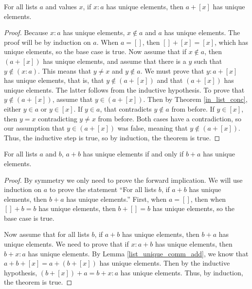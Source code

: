 \documentclass[../math.tex]{subfiles}
\begin{document}
\begin{lemma} \label{list_unique_comm_add}
    For all lists $a$ and values $x$, if $x : a$ has unique elements, then $a +
    [x]$ has unique elements.
\end{lemma}
\begin{proof}
    Because $x : a$ has unique elements, $x \notin a$ and $a$ has unique
    elements.  The proof will be by induction on $a$.  When $a = []$, then $[] +
    [x] = [x]$, which has unique elements, so the base case is true.  Now assume
    that if $x \notin a$, then $(a + [x])$ has unique elements, and assume that
    there is a $y$ such that $y \notin (x : a)$.  This means that $y \neq x$ and
    $y \notin a$.  We must prove that $y : a + [x]$ has unique elements, that
    is, that $y \notin (a + [x])$ and that $(a + [x])$ has unique elements.  The
    latter follows from the inductive hypothesis.  To prove that $y \notin (a +
    [x])$, assume that $y \in (a + [x])$.  Then by Theorem \ref{in_list_conc},
    either $y \in a$ or $y \in [x]$.  If $y \in a$, that contradicts $y \notin
    a$ from before.  If $y \in [x]$, then $y = x$ contradicting $y \neq x$ from
    before.  Both cases have a contradiction, so our assumption that $y \in (a +
    [x])$ was false, meaning that $y \notin (a + [x])$.  Thus, the inductive
    step is true, so by induction, the theorem is true.
\end{proof}

\begin{theorem} \label{list_unique_comm}
    For all lists $a$ and $b$, $a + b$ has unique elements if and only if $b +
    a$ has unique elements.
\end{theorem}
\begin{proof}
    By symmetry we only need to prove the forward implication.  We will use
    induction on $a$ to prove the statement ``For all lists $b$, if $a + b$ has
    unique elements, then $b + a$ has unique elements.''  First, when $a = []$,
    then when $[] + b = b$ has unique elements, then $b + [] = b$ has unique
    elements, so the base case is true.

    Now assume that for all lists $b$, if $a + b$ has unique elements, then $b +
    a$ has unique elements.  We need to prove that if $x : a + b$ has unique
    elements, then $b + x : a$ has unique elements.  By Lemma
    \ref{list_unique_comm_add}, we know that $a + b + [x] = a + (b + [x])$ has
    unique elements.  Then by the inductive hypothesis, $(b + [x]) + a = b + x :
    a$ has unique elements.  Thus, by induction, the theorem is true.
\end{proof}
\end{document}
